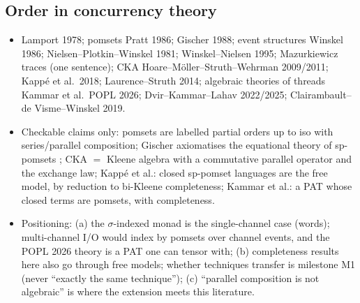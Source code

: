 \documentclass[11pt,a4paper]{article}
\newif\ifskeletonnotes
\newcommand{\sknote}[1]{\ifskeletonnotes{\small\color{blue!60!black}\textit{[#1]}}\fi}
\newcommand{\budget}[1]{\ifskeletonnotes{\small\color{red!60!black}\textbf{(\textasciitilde#1 words)}}\fi}
\newcommand{\sknew}[1]{\ifskeletonnotes{\color{purple!70!black}[NEW: #1]}\else#1\fi}
\begin{document}
\subsection{Order in concurrency theory}\budget{350}
\begin{itemize}[nosep]
\item \sknew{Lamport 1978}; pomsets \sknew{Pratt 1986; Gischer 1988}; event structures \sknew{Winskel 1986; Nielsen--Plotkin--Winskel 1981; Winskel--Nielsen 1995}; Mazurkiewicz traces (one sentence); CKA \sknew{Hoare--M\"oller--Struth--Wehrman 2009/2011; Kapp\'e et al.\ 2018; Laurence--Struth 2014}; algebraic theories of threads \sknew{Kammar et al.\ POPL 2026; Dvir--Kammar--Lahav 2022/2025}; \sknew{Clairambault--de Visme--Winskel 2019}.
\item Checkable claims only: pomsets are labelled partial orders up to iso with series/parallel composition; Gischer axiomatises the equational theory of sp-pomsets \sknote{verify on reading}; CKA $=$ Kleene algebra with a commutative parallel operator and the exchange law; Kapp\'e et al.: closed sp-pomset languages are the free model, by reduction to bi-Kleene completeness; Kammar et al.: a PAT whose closed terms are pomsets, with completeness.
\item Positioning: (a) the $\sigma$-indexed monad is the single-channel case (words); multi-channel I/O would index by pomsets over channel events, and the POPL 2026 theory is a PAT one can tensor with; (b) completeness results here also go through free models; whether techniques transfer is milestone M1 (never ``exactly the same technique''); (c) ``parallel composition is not algebraic'' is where the extension meets this literature.
\end{itemize}
\end{document}
